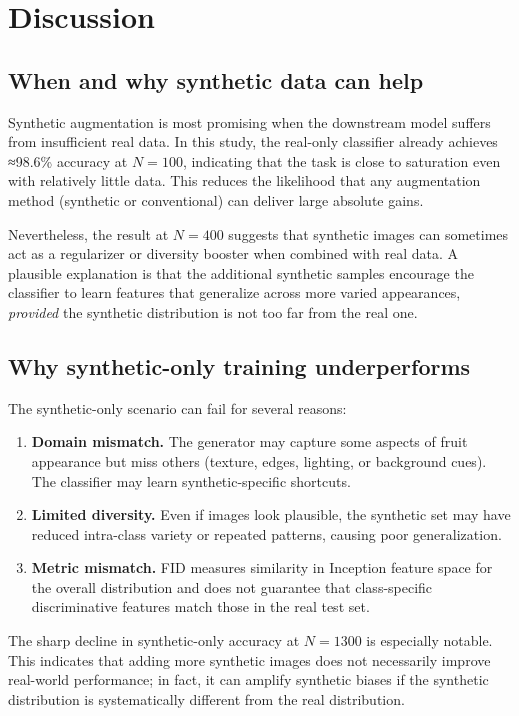 \section{Discussion}

\subsection{When and why synthetic data can help}

Synthetic augmentation is most promising when the downstream model suffers from insufficient real data. In this study, the real-only classifier already achieves ≈98.6\% accuracy at \(N=100\), indicating that the task is close to saturation even with relatively little data. This reduces the likelihood that any augmentation method (synthetic or conventional) can deliver large absolute gains.

Nevertheless, the result at \(N=400\) suggests that synthetic images can sometimes act as a regularizer or diversity booster when combined with real data. A plausible explanation is that the additional synthetic samples encourage the classifier to learn features that generalize across more varied appearances, \emph{provided} the synthetic distribution is not too far from the real one.

\subsection{Why synthetic-only training underperforms}

The synthetic-only scenario can fail for several reasons:
\begin{enumerate}
\item \textbf{Domain mismatch.} The generator may capture some aspects of fruit appearance but miss others (texture, edges, lighting, or background cues). The classifier may learn synthetic-specific shortcuts.
\item \textbf{Limited diversity.} Even if images look plausible, the synthetic set may have reduced intra-class variety or repeated patterns, causing poor generalization.
\item \textbf{Metric mismatch.} FID measures similarity in Inception feature space for the overall distribution and does not guarantee that class-specific discriminative features match those in the real test set.
\end{enumerate}

The sharp decline in synthetic-only accuracy at \(N=1300\) is especially notable. This indicates that adding more synthetic images does not necessarily improve real-world performance; in fact, it can amplify synthetic biases if the synthetic distribution is systematically different from the real distribution.

